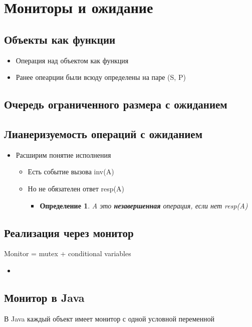 \documentclass[10pt,a4paper,oneside,titlepage]{article}
\theoremstyle{plain}
\theoremstyle{defenition}
\newtheorem*{defenition}{Определение}
\begin{document}
\section{Мониторы и ожидание}
\subsection{Объекты как функции}
\begin{itemize}
	\item Операция над объектом как функция
	\item Ранее опеарции были всюду определены на паре (S, P)
\end{itemize}

\subsection{Очередь ограниченного размера с ожиданием}

\subsection{Лианеризуемость операций с ожиданием}
\begin{itemize}
	\item Расширим понятие исполнения
	\begin{itemize}
		\item Есть событие вызова inv(A)
		\item Но не обязателен ответ resp(A)
		\begin{itemize}
			\item\begin{defenition}
				A это {\bfseries незавершенная} операция, если нет resp(A)
			\end{defenition}
		\end{itemize}
	\end{itemize}
\end{itemize}

\subsection{Реализация через монитор}
Monitor = mutex + conditional variables
\begin{itemize}
	
	\item
\end{itemize}

\subsection{Монитор в Java}
В Java каждый объект имеет монитор с одной условной переменной
\end{document}

